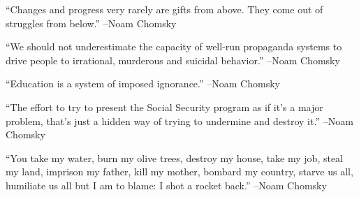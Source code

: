 \documentclass{article}%
\begin{document}
\linebreak%
\vspace{1mm}%
\begin{minipage}{\textwidth}%
\flushleft%
“Changes and progress very rarely are gifts from above. They come out of struggles from below.”%
\linebreak%
\vspace{1mm}%
–Noam Chomsky%
\linebreak%
\vspace{1mm}%
\end{minipage}%
\linebreak%
\vspace{1mm}%
\begin{minipage}{\textwidth}%
\flushleft%
“We should not underestimate the capacity of well{-}run propaganda systems to drive people to irrational, murderous and suicidal behavior.”%
\linebreak%
\vspace{1mm}%
–Noam Chomsky%
\linebreak%
\vspace{1mm}%
\end{minipage}%
\linebreak%
\vspace{1mm}%
\begin{minipage}{\textwidth}%
\flushleft%
“Education is a system of imposed ignorance.”%
\linebreak%
\vspace{1mm}%
–Noam Chomsky%
\linebreak%
\vspace{1mm}%
\end{minipage}%
\linebreak%
\vspace{1mm}%
\begin{minipage}{\textwidth}%
\flushleft%
“The effort to try to present the Social Security program as if it's a major problem, that's just a hidden way of trying to undermine and destroy it.”%
\linebreak%
\vspace{1mm}%
–Noam Chomsky%
\linebreak%
\vspace{1mm}%
\end{minipage}%
\linebreak%
\vspace{1mm}%
\begin{minipage}{\textwidth}%
\flushleft%
“You take my water, burn my olive trees, destroy my house, take my job, steal my land, imprison my father, kill my mother, bombard my country, starve us all, humiliate us all but I am to blame: I shot a rocket back.”%
\linebreak%
\vspace{1mm}%
–Noam Chomsky%
\linebreak%
\vspace{1mm}%
\end{minipage}%
\end{document}

